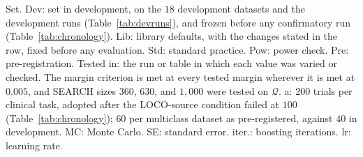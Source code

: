 \begin{table}[!t]
\vspace{2pt}
\parbox{\textwidth}{\justifying\scriptsize *Set. Dev: set in development, on the $18$ development datasets and the development runs (Table~\ref{tab:devruns}), and frozen before any confirmatory run (Table~\ref{tab:chronology}). Lib: library defaults, with the changes stated in the row, fixed before any evaluation. Std: standard practice. Pow: power check. Pre: pre-registration. Tested in: the run or table in which each value was varied or checked. The margin criterion is met at every tested margin wherever it is met at $0.005$, and SEARCH sizes $360$, $630$, and $1{,}000$ were tested on $\mathcal{Q}$. a: $200$ trials per clinical task, adopted after the LOCO-source condition failed at $100$ (Table~\ref{tab:chronology}); $60$ per multiclass dataset as pre-registered, against $40$ in development. MC: Monte Carlo. SE: standard error. iter.: boosting iterations. lr: learning rate.}
\end{table}
